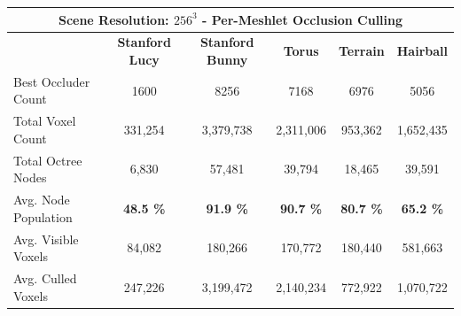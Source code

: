 \begin{table}[h]
  \label{tbl:culling-result-overview-pmoc}
  \begin{tabular}{|lccccc|}
  \hline
  \multicolumn{6}{|c|}{\textbf{Scene Resolution: $256^3$ - Per-Meshlet Occlusion Culling}}                                                                                                                                                                                        \\ \hline
  \multicolumn{1}{|l|}{}                          & \multicolumn{1}{|c|}{\textbf{Stanford Lucy}}  & \multicolumn{1}{c|}{\textbf{Stanford Bunny}}  & \multicolumn{1}{c|}{\textbf{Torus}}   & \multicolumn{1}{c|}{\textbf{Terrain}}     & \multicolumn{1}{c|}{\textbf{Hairball}}    \\ \hline
  \multicolumn{1}{|l|}{Best Occluder Count}       & \multicolumn{1}{c|}{1600}                     & \multicolumn{1}{c|}{8256}                     & \multicolumn{1}{c|}{7168}             & \multicolumn{1}{c|}{6976}                 & \multicolumn{1}{c|}{5056}                 \\ 
  \multicolumn{1}{|l|}{Total Voxel Count}         & \multicolumn{1}{c|}{331,254}                  & \multicolumn{1}{c|}{3,379,738}                & \multicolumn{1}{c|}{2,311,006}        & \multicolumn{1}{c|}{953,362}              & \multicolumn{1}{c|}{1,652,435}            \\
  \multicolumn{1}{|l|}{Total Octree Nodes}        & \multicolumn{1}{c|}{6,830}                    & \multicolumn{1}{c|}{57,481}                   & \multicolumn{1}{c|}{39,794}           & \multicolumn{1}{c|}{18,465}               & \multicolumn{1}{c|}{39,591}               \\
  \multicolumn{1}{|l|}{Avg. Node Population}      & \multicolumn{1}{c|}{\textbf{48.5 \%}}         & \multicolumn{1}{c|}{\textbf{91.9 \%}}         & \multicolumn{1}{c|}{\textbf{90.7 \%}} & \multicolumn{1}{c|}{\textbf{80.7 \%}}     & \multicolumn{1}{c|}{\textbf{65.2 \%}}     \\ \hline
  \multicolumn{1}{|l|}{Avg. Visible Voxels}       & \multicolumn{1}{c|}{84,082}                   & \multicolumn{1}{c|}{180,266}                  & \multicolumn{1}{c|}{170,772}          & \multicolumn{1}{c|}{180,440}              & \multicolumn{1}{c|}{581,663}              \\
  \multicolumn{1}{|l|}{Avg. Culled Voxels}        & \multicolumn{1}{c|}{247,226}                  & \multicolumn{1}{c|}{3,199,472}                & \multicolumn{1}{c|}{2,140,234}        & \multicolumn{1}{c|}{772,922}              & \multicolumn{1}{c|}{1,070,722}            \\

\end{tabular}
\end{table}
